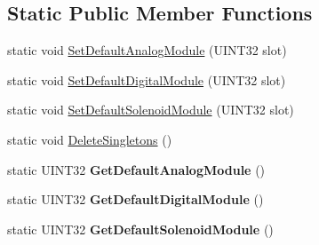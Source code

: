 \subsection*{\-Static \-Public \-Member \-Functions}
\begin{DoxyCompactItemize}
\item 
static void \hyperlink{classSensorBase_a8c49fc685a6e7f75c8b96e3b3c16a576}{\-Set\-Default\-Analog\-Module} (\-U\-I\-N\-T32 slot)
\item 
static void \hyperlink{classSensorBase_a9918cc94af5adbaa73d92fe5cce66eab}{\-Set\-Default\-Digital\-Module} (\-U\-I\-N\-T32 slot)
\item 
static void \hyperlink{classSensorBase_a960a069e2bdca4896dd1049fd4ae4aa1}{\-Set\-Default\-Solenoid\-Module} (\-U\-I\-N\-T32 slot)
\item 
static void \hyperlink{classSensorBase_aac521c8617e84c41c3e7c921302cdcc6}{\-Delete\-Singletons} ()
\item 
\hypertarget{classSensorBase_ac4b2b62295f1b7e43124c63340c2957b}{static \-U\-I\-N\-T32 {\bfseries \-Get\-Default\-Analog\-Module} ()}\label{classSensorBase_ac4b2b62295f1b7e43124c63340c2957b}

\item 
\hypertarget{classSensorBase_a58b76ce72e9d70bf88b613b9f979a555}{static \-U\-I\-N\-T32 {\bfseries \-Get\-Default\-Digital\-Module} ()}\label{classSensorBase_a58b76ce72e9d70bf88b613b9f979a555}

\item 
\hypertarget{classSensorBase_a75c14f39c43663aca647876cece69fa0}{static \-U\-I\-N\-T32 {\bfseries \-Get\-Default\-Solenoid\-Module} ()}\label{classSensorBase_a75c14f39c43663aca647876cece69fa0}


\end{DoxyCompactItemize}
